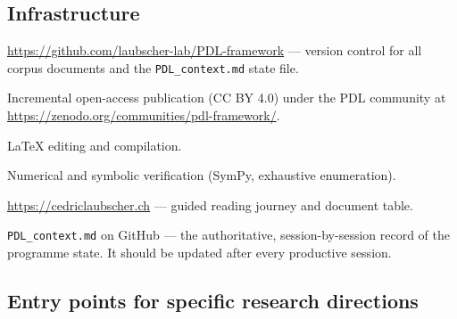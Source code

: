 \documentclass[11pt,a4paper]{article}
\theoremstyle{plain}
\theoremstyle{definition}
\theoremstyle{remark}
\begin{document}
\subsection{Infrastructure}
\label{subsec:infra}

\begin{description}[leftmargin=2.5cm,style=nextline]
\item[GitHub] \url{https://github.com/laubscher-lab/PDL-framework} — version control for all corpus documents and the \texttt{PDL\_context.md} state file.
\item[Zenodo] Incremental open-access publication (CC BY 4.0) under the PDL community at \url{https://zenodo.org/communities/pdl-framework/}.
\item[Overleaf] LaTeX editing and compilation.
\item[Google Colab] Numerical and symbolic verification (SymPy, exhaustive enumeration).
\item[Website] \url{https://cedriclaubscher.ch} — guided reading journey and document table.
\item[State file] \texttt{PDL\_context.md} on GitHub — the authoritative, session-by-session record of the programme state. It should be updated after every productive session.
\end{description}

\subsection{Entry points for specific research directions}
\label{subsec:entry_points}
\end{document}
